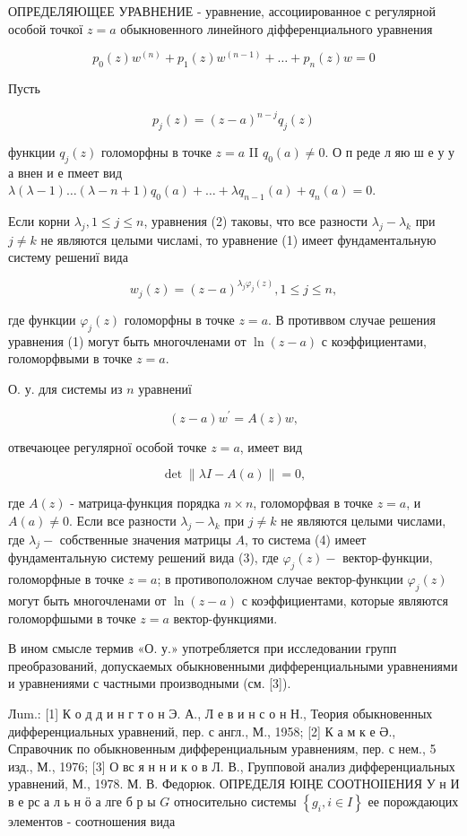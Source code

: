 \documentclass[10pt]{article}
\begin{document}
ОПРЕДЕЛЯЮЩЕЕ УРАВНЕНИЕ - уравнение, ассоциированное с регулярной особой точкої $z=a$ обыкновенного линейного діфференциального уравнения

\[
p_{0}(z) w^{(n)}+p_{1}(z) w^{(n-1)}+\ldots+p_{n}(z) w=0
\]

Пусть

\[
p_{j}(z)=(z-a)^{n-j} q_{j}(z)
\]

функции $q_{j}(z)$ голоморфны в точке $z=a$ II $q_{0}(a) \neq 0$. О п реде л яю ш е у у а внен и е пмеет вид $\lambda(\lambda-1) \ldots(\lambda-n+1) q_{0}(a)+\ldots+\lambda q_{n-1}(a)+q_{n}(a)=0$.

Если корни $\lambda_{j}, 1 \leqslant j \leqslant n$, уравнения (2) таковы, что все разности $\lambda_{j}-\lambda_{k}$ при $j \neq k$ не являются целыми числамі, то уравнение (1) имеет фундаментальную систему решениї вида

\[
w_{j}(z)=(z-a)^{\lambda_{j} \varphi_{j}(z)}, 1 \leqslant j \leqslant n,
\]

где функции $\varphi_{j}(z)$ голоморфны в точке $z=a$. В противвом случае решения уравнения (1) могут быть многочленами от $\ln (z-a)$ с коэффициентами, голоморфвыми в точке $z=a$.

О. у. для системы из $n$ уравнениї

\[
(z-a) w^{\prime}=A(z) w,
\]

отвечаюцее регулярної особой точке $z=a$, имеет вид

\[
\operatorname{det}\|\lambda I-A(a)\|=0,
\]

где $A(z)$ - матрица-функция порядка $n \times n$, голоморфвая в точке $z=a$, и $A(a) \neq 0$. Если все разности $\lambda_{j}-\lambda_{k}$ при $j \neq k$ не являются целыми числами, где $\lambda_{j}-$ собственные значения матрицы $A$, то система (4) имеет фундаментальную систему решений вида (3), где $\varphi_{j}(z)-$ вектор-функции, голоморфные в точке $z=a$; в противоположном случае вектор-функции $\varphi_{j}(z)$ могут быть многочленами от $\ln (z-a)$ с коэффициентами, которые являются голоморфшыми в точке $z=a$ вектор-функциями.

В ином смысле термив «О. у.» употребляется при исследовании групп преобразований, допускаемых обыкновенными дифференциальными уравнениями и уравнениями с частными производными (см. [3]).

Лum.: [1] К о д д и н г т о н Э. А., Л е в и н с о н Н., Теория обыкновенных дифференциальных уравнений, пер. с англ., М., 1958; [2] К а м к е Ә., Справочник по обыкновенным дифференциальным уравнениям, пер. с нем., 5 изд., М., 1976; [3] О вс я н н и к о в Л. В., Групповой анализ дифференциальных уравнений, М., 1978. М. В. Федорюк. ОПРЕДЕЛЯ ЮІҢЕ СООТНОІІЕНИЯ У н И в е рс а л ь н ӧ а лге б р ы $G$ относительно системы $\left\{g_{i}, i \in I\right\}$ ее порождаюцих элементов - соотношения вида
\end{document}

